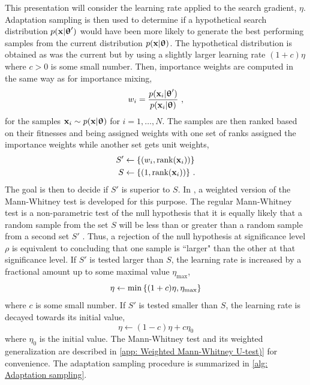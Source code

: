 This presentation will consider the learning rate applied to the search gradient, $\eta$. Adaptation sampling is then used to determine if a hypothetical search distribution $p({\mathbf{x}}|{\boldsymbol{\uptheta}}')$ would have been more likely to generate the best performing samples from the current distribution $p({\mathbf{x}}|{\boldsymbol{\uptheta}})$. The hypothetical distribution is obtained as was the current but by using a slightly larger learning rate $(1+c)\eta$ where $c>0$ is some small number. Then, importance weights are computed in the same way as for importance mixing,
\begin{equation}
    w_i=\frac{p(\x_i|\thetab')}{p(\x_i|\thetab)} \ ,
\end{equation}
for the samples ${\mathbf{x}}_i\sim p({\mathbf{x}}|{\boldsymbol{\uptheta}})$ for $i=1,\dots,N$. The samples are then ranked based on their fitnesses and being assigned weights with one set of ranks assigned the importance weights while another set gets unit weights,
\begin{equation}
    \begin{aligned}
        S'&\gets{\left\{{\left(w_i,\text{rank}({\mathbf{x}}_i)\right)}\right\}}\\
        S&\gets{\left\{{\left(1,\text{rank}({\mathbf{x}}_i)\right)}\right\}} \ .
    \end{aligned}
\end{equation}
The goal is then to decide if $S'$ is superior to $S$. In \cite{Schaul2011a}, a weighted version of the Mann-Whitney test is developed for this purpose. The regular Mann-Whitney test is a non-parametric test of the null hypothesis that it is equally likely that a random sample from the set $S$ will be less than or greater than a random sample from a second set $S'$ \cite{Mann1947}. 
Thus, a rejection of the null hypothesis at significance level $\rho$ is equivalent to concluding that one sample is ``larger" than the other at that significance level. If $S'$ is tested larger than $S$, the learning rate is increased by a fractional amount up to some maximal value $\eta_\text{max}$, 
\begin{equation}
    \eta\gets \min{\left\{(1+c)\eta,\eta_\text{max}\right\}}
\end{equation}
where $c$ is some small number. If $S'$ is tested smaller than $S$, the learning rate is decayed towards its initial value,
\begin{equation}
    \eta\gets(1-c)\eta+c\eta_0
\end{equation}
where $\eta_0$ is the initial value. The Mann-Whitney test and its weighted generalization are described in \autoref{app: Weighted Mann-Whitney U-test)} for convenience. The adaptation sampling procedure is summarized in \autoref{alg: Adaptation sampling}.

